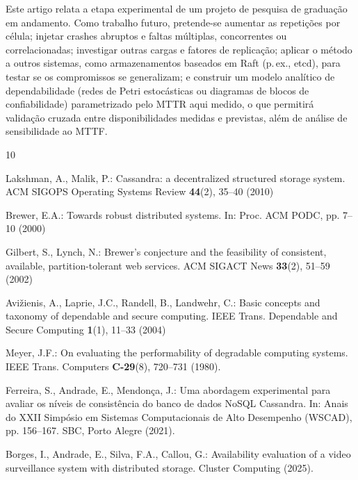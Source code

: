 \documentclass[runningheads]{llncs}
\begin{document}
Este artigo relata a etapa experimental de um projeto de pesquisa de graduação em
andamento. Como trabalho futuro, pretende-se aumentar as repetições por célula;
injetar crashes abruptos e faltas múltiplas, concorrentes ou correlacionadas;
investigar outras cargas e fatores de replicação; aplicar o método a outros
sistemas, como armazenamentos baseados em Raft (p.\,ex., etcd), para testar se
os compromissos se generalizam; e construir um modelo analítico de dependabilidade
(redes de Petri estocásticas ou diagramas de blocos de confiabilidade)
parametrizado pelo MTTR aqui medido, o que permitirá validação cruzada entre
disponibilidades medidas e previstas, além de análise de sensibilidade ao MTTF.

\begin{thebibliography}{10}
\setlength{\itemsep}{-1pt plus 0.2pt}

Lakshman, A., Malik, P.: Cassandra: a decentralized structured storage system.
ACM SIGOPS Operating Systems Review \textbf{44}(2), 35--40 (2010)

Brewer, E.A.: Towards robust distributed systems. In: Proc. ACM PODC, pp. 7--10
(2000)

Gilbert, S., Lynch, N.: Brewer's conjecture and the feasibility of consistent,
available, partition-tolerant web services. ACM SIGACT News \textbf{33}(2),
51--59 (2002)

Avi\v{z}ienis, A., Laprie, J.C., Randell, B., Landwehr, C.: Basic concepts and
taxonomy of dependable and secure computing. IEEE Trans. Dependable and Secure
Computing \textbf{1}(1), 11--33 (2004)

Meyer, J.F.: On evaluating the performability of degradable computing systems.
IEEE Trans. Computers \textbf{C-29}(8), 720--731 (1980).

Ferreira, S., Andrade, E., Mendonça, J.: Uma abordagem experimental para
avaliar os níveis de consistência do banco de dados NoSQL Cassandra. In: Anais
do XXII Simpósio em Sistemas Computacionais de Alto Desempenho (WSCAD),
pp. 156--167. SBC, Porto Alegre (2021). 

Borges, I., Andrade, E., Silva, F.A., Callou, G.: Availability evaluation of a
video surveillance system with distributed storage. Cluster Computing (2025).


\end{thebibliography}
\end{document}

